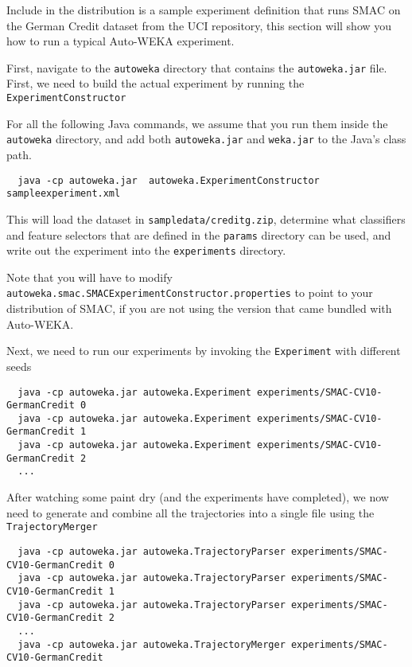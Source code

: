 
Include in the distribution is a sample experiment definition that runs SMAC on the German Credit dataset from the UCI repository, this section will show you how to run a typical Auto-WEKA experiment.

First, navigate to the \texttt{autoweka} directory that contains the \texttt{autoweka.jar} file. First, we need to build the actual experiment by running the \texttt{ExperimentConstructor}

\begin{aside}
 For all the following Java commands, we assume that you run them inside the \texttt{autoweka} directory, and add both \texttt{autoweka.jar} and \texttt{weka.jar} to the Java's class path.
\end{aside}

\begin{verbatim}
  java -cp autoweka.jar  autoweka.ExperimentConstructor sampleexperiment.xml
\end{verbatim}

This will load the dataset in \texttt{sampledata/creditg.zip}, determine what classifiers and feature selectors that are defined in the \texttt{params} directory can be used, and write out the experiment into the \texttt{experiments} directory.

\begin{aside}
 Note that you will have to modify \texttt{autoweka.smac.SMACExperimentConstructor.properties} to point to your distribution of SMAC, if you are not using the version that came bundled with Auto-WEKA.
\end{aside}

Next, we need to run our experiments by invoking the \texttt{Experiment} with different seeds

\begin{verbatim}
  java -cp autoweka.jar autoweka.Experiment experiments/SMAC-CV10-GermanCredit 0
  java -cp autoweka.jar autoweka.Experiment experiments/SMAC-CV10-GermanCredit 1
  java -cp autoweka.jar autoweka.Experiment experiments/SMAC-CV10-GermanCredit 2
  ...
\end{verbatim}

After watching some paint dry (and the experiments have completed), we now need to generate and combine all the trajectories into a single file using the \texttt{TrajectoryMerger}

\begin{verbatim}
  java -cp autoweka.jar autoweka.TrajectoryParser experiments/SMAC-CV10-GermanCredit 0
  java -cp autoweka.jar autoweka.TrajectoryParser experiments/SMAC-CV10-GermanCredit 1
  java -cp autoweka.jar autoweka.TrajectoryParser experiments/SMAC-CV10-GermanCredit 2
  ...
  java -cp autoweka.jar autoweka.TrajectoryMerger experiments/SMAC-CV10-GermanCredit
\end{verbatim}

